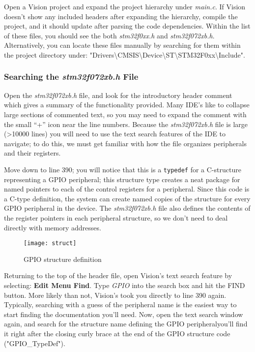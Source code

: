 \documentclass[11pt,fleqn]{book} %
\begin{document}
Open a {\textmu}Vision project and expand the project hierarchy under \textit{main.c}. If {\textmu}Vision doesn't show any included headers after expanding the hierarchy, compile the project, and it should update after parsing the code dependencies. Within the list of these files, you should see the both \textit{stm32f0xx.h} and \textit{stm32f072xb.h}.  Alternatively, you can locate these files manually by searching for them within the project directory under: "Drivers\textbackslash CMSIS\textbackslash Device\textbackslash ST\textbackslash STM32F0xx\textbackslash Include". 

\subsubsection{Searching the \textit{stm32f072xb.h} File}

Open the \textit{stm32f072xb.h} file, and look for the introductory header comment which gives a summary of the functionality provided. Many IDE's like to collapse large sections of commented text, so you may need to expand the comment with the small ``+'' icon near the line numbers. Because the \textit{stm32f072xb.h} file is large (>10000 lines) you will need to use the text search features of the IDE to navigate; to do this, we must get familiar with how the file organizes peripherals and their registers.

Move down to line 390; you will notice that this is a \texttt{typedef} for a C-structure representing a GPIO peripheral; this structure type creates a neat package for named pointers to each of the control registers for a peripheral. Since this code is a C-type definition, the system can create named copies of the structure for every GPIO peripheral in the device. The \textit{stm32f072xb.h} file also defines the contents of the register pointers in each peripheral structure, so we don't need to deal directly with memory addresses.

\begin{figure}[]
    \centering\texttt{[image: struct]}
    \caption{GPIO structure definition}
    \label{struct}
\end{figure}

Returning to the top of the header file, open {\textmu}Vision's text search feature by selecting: \textbf{Edit Menu \textrightarrow Find}. Type \textit{GPIO} into the search box and hit the FIND button. More likely than not, {\textmu}Vision's took you directly to line 390 again. Typically, searching with a guess of the peripheral name is the easiest way to start finding the documentation you'll need. Now, open the text search window again, and search for the structure name defining the GPIO peripheral\textemdash you'll find it right after the closing curly brace at the end of the GPIO structure code ("GPIO\_TypeDef").
\end{document}
